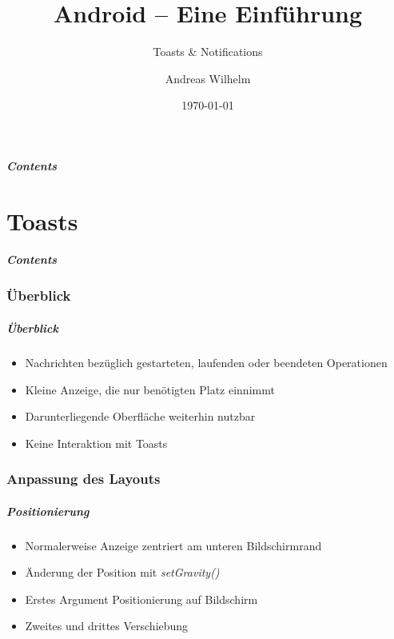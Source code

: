 \title{Android -- Eine Einführung}
\subtitle{Toasts \& Notifications}
\author[A. Wilhelm]{Andreas Wilhelm}
\titlegraphic{}
\date{\today}

\begin{frame}[plain]
  \titlepage
\end{frame}

\section[Contents]{}
\begin{frame}
	\frametitle{Contents}
	\tableofcontents[onlyparts]
\end{frame}

\part{Toasts}
\frame{\partpage}
\begin{frame}
	\frametitle{Contents}
	\tableofcontents[]
\end{frame}

\section{Überblick}
\begin{frame}
   \frametitle{Überblick}
   \begin{itemize}
      \item Nachrichten bezüglich gestarteten, laufenden oder beendeten 
         Operationen
      \item Kleine Anzeige, die nur benötigten Platz einnimmt
      \item Darunterliegende Oberfläche weiterhin nutzbar
      \item Keine Interaktion mit Toasts
   \end{itemize}

   
\end{frame}

\section{Anpassung des Layouts}
\begin{frame}
   \frametitle{Positionierung}
   \begin{itemize}
      \item Normalerweise Anzeige zentriert am unteren Bildschirmrand
      \item Änderung der Position mit \emph{setGravity()}
      \item Erstes Argument Positionierung auf Bildschirm
      \item Zweites und drittes Verschiebung
   \end{itemize}

   
\end{frame}

